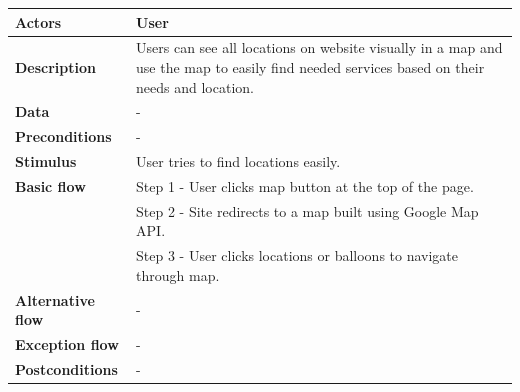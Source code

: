 \begin{center}
\begin{table}[H]
\begin{tabular}{| m{3cm}| m{10cm} |}
            \hline
            \textbf{Actors}           & User                                                                                                                                       \\
            \hline
            \textbf{Description}      & Users can see all locations on website visually in a map and use the map to easily find needed services based on their needs and location. \\
            \hline
            \textbf{Data}             & -                                                                                                                                          \\
            \hline
            \textbf{Preconditions}    & -                                                                                                                                          \\
            \hline
            \textbf{Stimulus}         & User tries to find locations easily.                                                                                                       \\
            \hline
            \textbf{Basic flow}       & Step 1 - User clicks map button at the top of the page.                                                                                    \\
                                      & Step 2 - Site redirects to a map built using Google Map API.                                                                               \\
                                      & Step 3 - User clicks locations or balloons to navigate through map.                                                                        \\
            \hline
            \textbf{Alternative flow} & -                                                                                                                                          \\
            \hline
            \textbf{Exception flow}   & -                                                                                                                                          \\
            \hline
            \textbf{Postconditions}   & -                                                                                                                                          \\

\end{tabular}
\end{table}
\end{center}
